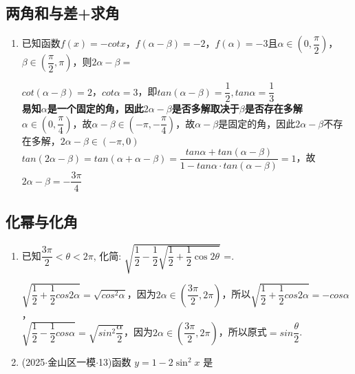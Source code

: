 \subsection*{两角和与差+求角}
\begin{enumerate}
    \item 已知函数$f(x) = -cotx$，$f(\alpha - \beta) = -2$，$f(\alpha) = -3$且$\alpha \in (0, \dfrac{\pi}{2})$，$\beta \in (\dfrac{\pi}{2}, \pi)$，则$2\alpha - \beta = $
    \begin{jieda}
        $cot(\alpha - \beta) = 2$，$cot\alpha = 3$，即$tan(\alpha - \beta) = \dfrac{1}{2}, tan\alpha = \dfrac{1}{3}$\\
        \textbf{易知$\alpha$是一个固定的角，因此$2\alpha - \beta$是否多解取决于$\beta$是否存在多解} \\
            $\alpha \in (0, \dfrac{\pi}{4})$，故$\alpha - \beta \in (-\pi, -\dfrac{\pi}{4})$，故$\alpha - \beta$是固定的角，因此$2\alpha - \beta$不存在多解，$2\alpha - \beta \in (-\pi, 0)$ \\
        $tan(2\alpha - \beta) = tan(\alpha + \alpha - \beta) = \dfrac{tan\alpha + tan(\alpha-\beta)}{1-tan\alpha \cdot tan(\alpha - \beta)} = 1$，故$2\alpha - \beta = -\dfrac{3\pi}{4}$
    \end{jieda}
\end{enumerate}

\subsection*{化幂与化角}
\begin{enumerate}
    \item 已知$\dfrac{3\pi}{2}<\theta<2\pi$, 化简: $\sqrt{\dfrac{1}{2}-\dfrac{1}{2}\sqrt{\dfrac{1}{2}+\dfrac{1}{2}\cos2\theta}}$ =.         
    \begin{jieda}
        $\sqrt{\dfrac{1}{2}+\dfrac{1}{2}cos2\alpha} = \sqrt{cos^2\alpha}$，因为$2\alpha \in (\dfrac{3\pi}{2}, 2\pi)$，所以$\sqrt{\dfrac{1}{2}+\dfrac{1}{2}cos2\alpha} = -cos\alpha$，\\
        $\sqrt{\dfrac{1}{2}-\dfrac{1}{2}cos\alpha} = \sqrt{sin^2\dfrac{\alpha}{2}}$，因为$2\alpha \in (\dfrac{3\pi}{2}, 2\pi)$，所以原式$=sin\dfrac{\theta}{2}$.
    \end{jieda}
    \item (2025$\cdot$金山区一模$\cdot$13)函数 $y = 1 - 2{\sin }^{2}x$ 是 
\end{enumerate}

